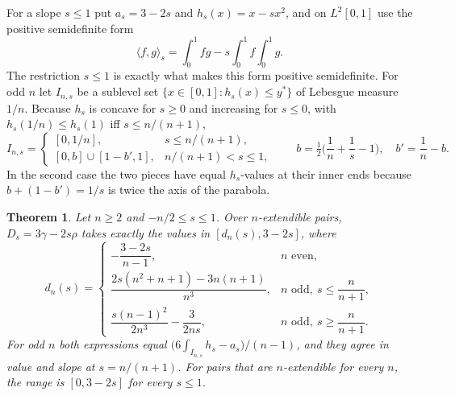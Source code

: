 \documentclass[11pt,a4paper]{article}
\newtheorem{theorem}{Theorem}[section]
\theoremstyle{remark}
\begin{document}
For a slope $s\leq1$ put $a_s=3-2s$ and $h_s(x)=x-sx^2$, and on $L^2[0,1]$ use the positive semidefinite form
\[
 \langle f,g\rangle_s=\int_0^1fg-s\int_0^1f\int_0^1g .
\]
The restriction $s\leq1$ is exactly what makes this form positive semidefinite. For odd $n$ let $I_{n,s}$ be a sublevel set $\{x\in[0,1]:h_s(x)\leq y^*\}$ of Lebesgue measure $1/n$. Because $h_s$ is concave for $s\geq0$ and increasing for $s\leq0$, with $h_s(1/n)\leq h_s(1)$ iff $s\leq n/(n+1)$,
\[
 I_{n,s}=\begin{cases}[0,1/n], & s\leq n/(n+1),\\[2pt] [0,b]\cup[1-b',1], & n/(n+1)<s\leq1,\end{cases}\qquad b=\tfrac12\Big(\frac1n+\frac1s-1\Big),\quad b'=\frac1n-b .
\]
In the second case the two pieces have equal $h_s$-values at their inner ends because $b+(1-b')=1/s$ is twice the axis of the parabola.

\begin{theorem}\label{thm:finite}
Let $n\geq2$ and $-n/2\leq s\leq1$. Over $n$-extendible pairs, $D_s=3\gamma-2s\rho$ takes exactly the values in $[d_n(s),3-2s]$, where
\[
 d_n(s)=\begin{cases}
 -\dfrac{3-2s}{n-1}, & n\text{ even},\\[8pt]
 \dfrac{2s(n^2+n+1)-3n(n+1)}{n^3}, & n\text{ odd},\ s\leq\dfrac{n}{n+1},\\[8pt]
 \dfrac{s(n-1)^2}{2n^3}-\dfrac{3}{2ns}, & n\text{ odd},\ s\geq\dfrac{n}{n+1}.
 \end{cases}
\]
For odd $n$ both expressions equal $\big(6\int_{I_{n,s}}h_s-a_s\big)/(n-1)$, and they agree in value and slope at $s=n/(n+1)$. For pairs that are $n$-extendible for every $n$, the range is $[0,3-2s]$ for every $s\leq1$.
\end{theorem}
\end{document}
